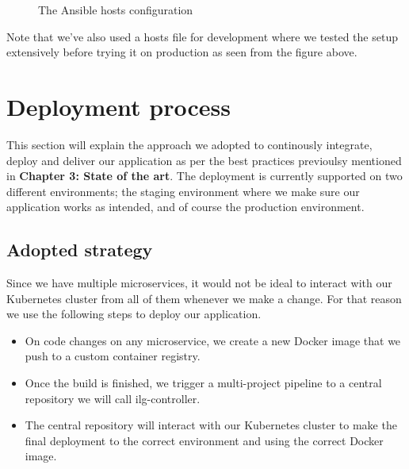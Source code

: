 \begin{figure}[H]
    \centering
    \caption{The Ansible hosts configuration}
    \label{fig:image-of-ansible-hosts}
\end{figure}
Note that we've also used a hosts file for development where we tested the setup extensively before trying it on production as seen from the figure above.

\section{Deployment process}
This section will explain the approach we adopted to continously integrate, deploy and deliver our application as per the best practices previoulsy mentioned in \textbf{Chapter 3: State of the art}.
The deployment is currently supported on two different environments; the staging environment where we make sure our application works as intended, and of course the production environment.

\subsection{Adopted strategy}
Since we have multiple microservices, it would not be ideal to interact with our Kubernetes cluster from all of them whenever we make a change.
For that reason we use the following steps to deploy our application.
\begin{itemize}
    \item On code changes on any microservice, we create a new Docker image that we push to a custom container registry.
    \item Once the build is finished, we trigger a multi-project pipeline to a central repository we will call ilg-controller.
    \item The central repository will interact with our Kubernetes cluster to make the final deployment to the correct environment and using the correct Docker image.
\end{itemize}

